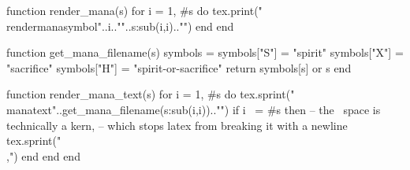 \begin{luacode*}
    function render_mana(s)
        for i = 1, #s do
            tex.print("\\rendermanasymbol{"..i.."}{"..s:sub(i,i).."}")
        end
    end
\end{luacode*}
\newcommand{\rendermana}[1]{\directlua{render_mana(\luastring{#1})}}


\newcommand{\manatext}[1]{%
    \smash{\scalerel*{\texttt{[image: icons/mana/\#1.png]}}{\strut}}%
}
\begin{luacode*}
    function get_mana_filename(s)
        symbols = {}
        symbols["S"] = "spirit"
        symbols["X"] = "sacrifice"
        symbols["H"] = "spirit-or-sacrifice"
        return symbols[s] or s
    end

    function render_mana_text(s)
        for i = 1, #s do
            tex.sprint("\\manatext{"..get_mana_filename(s:sub(i,i)).."}")
            if i ~= #s then 
                -- the \, space is technically a kern, 
                -- which stops latex from breaking it with a newline
                tex.sprint("\\,")
            end
        end
    end
\end{luacode*}
\newcommand{\mana}[1]{\directlua{render_mana_text(\luastring{#1})}}








